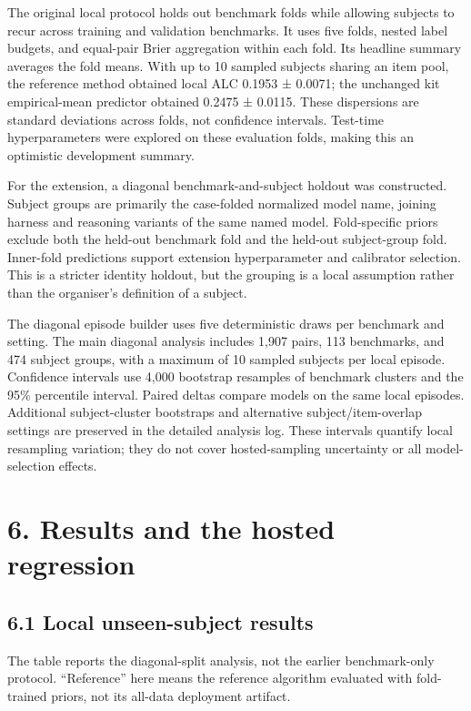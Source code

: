 \documentclass{article}
\begin{document}
The original local protocol holds out benchmark folds while allowing subjects to recur across training and validation benchmarks. It uses five folds, nested label budgets, and equal-pair Brier aggregation within each fold. Its headline summary averages the fold means. With up to 10 sampled subjects sharing an item pool, the reference method obtained local ALC 0.1953 ± 0.0071; the unchanged kit empirical-mean predictor obtained 0.2475 ± 0.0115. These dispersions are standard deviations across folds, not confidence intervals. Test-time hyperparameters were explored on these evaluation folds, making this an optimistic development summary.

For the extension, a diagonal benchmark-and-subject holdout was constructed. Subject groups are primarily the case-folded normalized model name, joining harness and reasoning variants of the same named model. Fold-specific priors exclude both the held-out benchmark fold and the held-out subject-group fold. Inner-fold predictions support extension hyperparameter and calibrator selection. This is a stricter identity holdout, but the grouping is a local assumption rather than the organiser's definition of a subject.

The diagonal episode builder uses five deterministic draws per benchmark and setting. The main diagonal analysis includes 1,907 pairs, 113 benchmarks, and 474 subject groups, with a maximum of 10 sampled subjects per local episode. Confidence intervals use 4,000 bootstrap resamples of benchmark clusters and the 95\% percentile interval. Paired deltas compare models on the same local episodes. Additional subject-cluster bootstraps and alternative subject/item-overlap settings are preserved in the detailed analysis log. These intervals quantify local resampling variation; they do not cover hosted-sampling uncertainty or all model-selection effects.

\section{6. Results and the hosted regression}\label{results-and-the-hosted-regression}

\subsection{6.1 Local unseen-subject results}\label{local-unseen-subject-results}

The table reports the diagonal-split analysis, not the earlier benchmark-only protocol. ``Reference'' here means the reference algorithm evaluated with fold-trained priors, not its all-data deployment artifact.
\end{document}
